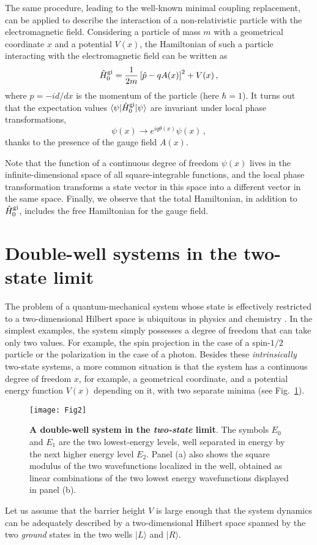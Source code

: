 \documentclass[aps,pra,reprint, superscriptaddress,amsmath,showpacs,longbibliography]{revtex4-2}
\newcommand{\figref}[1]{\mbox{Fig.~\ref{#1}}}
\newcommand{\be}{\begin{equation}}
\newcommand{\ee}{\end{equation}}
\begin{document}
The same procedure, leading to the well-known minimal coupling replacement, can be applied to describe the interaction of a non-relativistic particle with the electromagnetic field. 
Considering a particle of mass {$m$} with a geometrical coordinate $x$ and a potential $V(x)$, the Hamiltonian of such a particle interacting with the electromagnetic field can be written as
\be\label{mcr}
\hat H_0^{\rm gi} = \frac{1}{2 m} \left[\hat p - q A (x) \right]^2  + V(x)\, ,
\ee
where $\hat p = - i d/dx$ is the momentum of the particle (here $\hbar =1$).
It turns out that the expectation values $\langle \psi | \hat H_0^{\rm gi} | \psi \rangle$ are invariant under local phase transformations,
\be\label{phasex}
\psi(x) \to e^{iq \theta(x)} \psi (x)\, ,
\ee
 thanks to the presence of the gauge field $A(x)$.

Note that the function of a continuous degree of freedom $\psi (x)$ lives in the infinite-dimensional space of all square-integrable functions, and the local phase transformation transforms a state vector in this space into a different vector in the same space. 
Finally, we observe that the total Hamiltonian, in addition to $\hat H_0^{\rm gi}$, includes the free Hamiltonian for the gauge field.


\section{Double-well systems  in the two-state limit}\label{doublewell}
The problem of a quantum-mechanical system whose
state is effectively restricted to a two-dimensional Hilbert
space is ubiquitous in physics and chemistry \cite{Leggett1987}. In the simplest
examples, the system 
simply possesses a degree of
freedom that can take only two values. For example, the
spin projection in the case of a 
spin-$1/2$ particle  or the polarization
in the case of a photon. Besides these
{\em intrinsically} two-state systems, a more common situation
is that the system has a continuous
degree of freedom $x$, for example, a geometrical coordinate, and a potential energy function
$V(x)$ depending on it, with two separate minima \cite{Leggett1987} (see \figref{fig1}). 
\begin{figure}[htpb] 
	\centering
	\texttt{[image: Fig2]} 
	\caption{{\bf A double-well system in the {\em two-state} limit}. {The symbols} $E_0$ and $E_1$ are the two lowest-energy levels, well separated in energy by the next higher energy level $E_2$. Panel (a) also shows the square modulus of the two wavefunctions localized in the well, obtained as linear combinations of the two lowest energy wavefunctions displayed in panel (b).}

	\label{fig1}
\end{figure}
 Let us assume that the barrier height $V$ is large enough that the system dynamics can be adequately described by a two-dimensional Hilbert space spanned by the two {\em ground} states in the two wells $| L \rangle$ and $| R \rangle$. 
\end{document}
